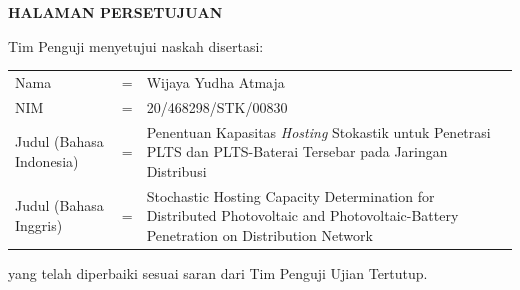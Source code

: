 \BgThispage
\centerline{\fontsize{14}{16}\textbf{HALAMAN PERSETUJUAN}}
\vspace*{27pt}
\noindent Tim Penguji menyetujui naskah disertasi:
\vspace*{-8pt}
{
\begin{longtable}{llp{264pt}}
	\hspace*{-11pt}Nama						& = & Wijaya Yudha Atmaja\\
	\hspace*{-11pt}NIM						& = & 20/468298/STK/00830\\
	\hspace*{-11pt}Judul (Bahasa Indonesia)	& = & Penentuan Kapasitas \textit{Hosting} Stokastik untuk Penetrasi PLTS dan PLTS-Baterai Tersebar pada Jaringan Distribusi\\
	\hspace*{-11pt}Judul	(Bahasa Inggris) 	& = & Stochastic Hosting Capacity Determination for Distributed Photovoltaic and Photovoltaic-Battery Penetration on Distribution Network
\end{longtable}
}
\vspace*{-22pt}
\noindent yang telah diperbaiki sesuai saran dari Tim Penguji Ujian Tertutup.

